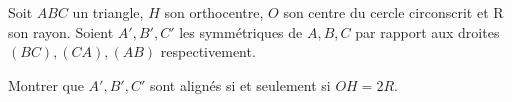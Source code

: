 Soit $ABC$ un triangle, $H$ son orthocentre, $O$ son centre du cercle circonscrit et R son rayon. Soient $A', B', C'$ les symmétriques de $A, B, C$ par rapport aux droites $(BC), (CA), (AB)$ respectivement.

Montrer que $A', B', C'$ sont alignés si et seulement si $OH = 2R$.